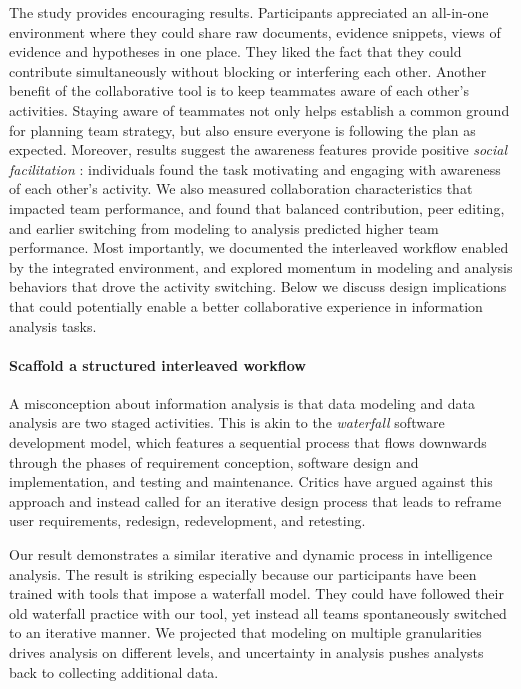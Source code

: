 The study provides encouraging results. Participants appreciated an all-in-one
environment where they could share raw documents, evidence snippets, views of
evidence and hypotheses in one place. They liked the fact that they could
contribute simultaneously without blocking or interfering each other. Another
benefit of the collaborative tool is to keep teammates aware of each other's
activities. Staying aware of teammates not only helps establish a common ground
for planning team strategy, but also ensure everyone is following the plan as
expected. Moreover, results suggest the awareness features provide positive
\emph{social facilitation} \cite{Zajonc1965}: individuals found the task
motivating and engaging with awareness of each other's activity. We also
measured collaboration characteristics that impacted team performance, and found
that balanced contribution, peer editing, and earlier switching from modeling to
analysis predicted higher team performance. Most importantly, we documented the
interleaved workflow enabled by the integrated environment, and explored
momentum in modeling and analysis behaviors that drove the activity switching.
Below we discuss design implications that could potentially enable a better
collaborative experience in information analysis tasks.

\paragraph{Scaffold a structured interleaved workflow}

A misconception about information analysis is that data modeling and
data analysis are two staged activities. This is akin to the \emph{waterfall}
software development model, which features a sequential process that
flows downwards through the phases of requirement conception, software
design and implementation, and testing and maintenance. Critics have
argued against this approach and instead called for an iterative design
process that leads to reframe user requirements,
redesign, redevelopment, and retesting.

Our result demonstrates a similar iterative and dynamic process in intelligence
analysis. The result is striking especially because our participants have been
trained with tools that impose a waterfall model. They could have followed their
old waterfall practice with our tool, yet instead all teams spontaneously
switched to an iterative manner. We projected that modeling on multiple granularities drives analysis on different levels, and uncertainty in analysis pushes analysts back to collecting additional data.

